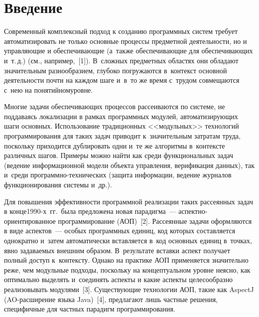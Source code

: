 
\thispagestyle{headings}

\begin{multicols}{2}

\label{st\stat}

\section{Введение}

 Современный комплексный подход к созданию программных систем требует
автоматизировать не только основные процессы предметной дея\-тель\-ности, но и
управляющие и обеспечи\-ва\-ющие (а~также обеспечивающие для
обеспечи\-ва\-ющих и~т.\,д.) (см., например,~[1]). В~сложных предметных
областях они обладают значительным разнообразием, глубоко погружаются
в~контекст основной деятельности почти на каждом шаге и~в~то же \mbox{время}
с~трудом совмещаются с~нею на понятийном\linebreak уровне.

Многие задачи
обеспечивающих процессов рассеивают\-ся по системе, не поддаваясь
локализации в рамках программных модулей, авто\-ма\-тизирующих шаги
основных. Использование традицион\-ных <<модульных>> технологий
программирования для таких задач приводит к~значительным затратам труда,
поскольку приходится дуб\-ли\-ро\-вать одни и~те же алгоритмы в~контексте
\mbox{различных} шагов. Примеры можно найти как среди функциональных задач
(ведение информационной модели объекта управления, верификация данных),
так и~среди про\-грамм\-но-тех\-ни\-че\-ских (защита информации, ведение
журналов функционирования системы и~др.).

 Для повышения эффективности программной реализации таких рассеянных
задач в конце\linebreak \mbox{1990-х~гг.}\ была предложена новая парадигма~---
 ас\-пект\-но-ори\-ен\-ти\-ро\-ван\-ное программирование (АОП)~[2].
Рассеянные задачи оформляются в виде аспектов~--- особых программных
единиц, код которых со\-став\-ля\-ет\-ся однократно и~затем автоматически
встав\-ля\-ет\-ся в~код основных единиц в~точках, явно задаваемых внешним
образом. В~результате вставки аспект получает полный доступ к~контексту.
Однако на практике АОП применяется значительно реже, чем модульные
подходы, поскольку на концептуальном уровне неясно, как оптимально
выделять и~соединять аспекты и какие аспекты целесообразно реализовывать
модулями~[3]. Существующие технологии АОП, такие как AspectJ
 (AO-расширение языка Java)~[4],
предлагают лишь частные решения, специфичные для частных парадигм
программирования.


\end{multicols}
